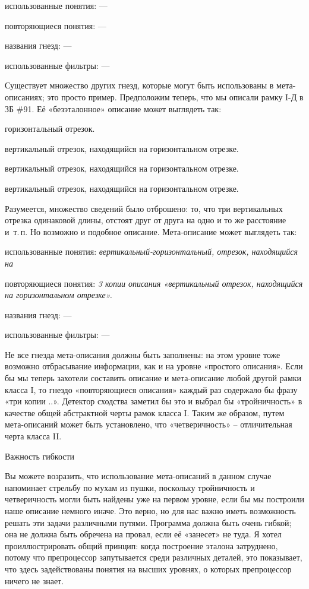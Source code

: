 \documentclass[../main.tex]{subfiles}
\begin{document}
использованные понятия: ---

повторяющиеся понятия: ---

названия гнезд: ---

использованные фильтры: ---

Существует множество других гнезд, которые могут быть использованы в мета-описаниях; это просто пример. Предположим теперь, что мы описали рамку I-Д в ЗБ \#91. Её «безэталонное» описание может выглядеть так:

горизонтальный отрезок.

вертикальный отрезок, находящийся на горизонтальном отрезке.

вертикальный отрезок, находящийся на горизонтальном отрезке.

вертикальный отрезок, находящийся на горизонтальном отрезке.

Разумеется, множество сведений было отброшено: то, что три вертикальных отрезка одинаковой длины, отстоят друг от друга на одно и то же расстояние и~т.\,п. Но возможно и подобное описание. Мета-описание может выглядеть так:

использованные понятия: \emph{вертикальный-горизонтальный, отрезок, находящийся на}

повторяющиеся понятия: \emph{3 копии описания «вертикальный отрезок, находящийся на горизонтальном отрезке».}

названия гнезд: ---

использованные фильтры: ---

Не все гнезда мета-описания должны быть заполнены: на этом уровне тоже возможно отбрасывание информации, как и на уровне «простого описания». Если бы мы теперь захотели составить описание и мета-описание любой другой рамки класса I, то гнездо «повторяющиеся описания» каждый раз содержало бы фразу «три копии ..». Детектор сходства заметил бы это и выбрал бы «тройничность» в качестве общей абстрактной черты рамок класса I. Таким же образом, путем мета-описаний может быть установлено, что «четверичность» \--- отличительная черта класса II.

Важность гибкости

Вы можете возразить, что использование мета-описаний в данном случае напоминает стрельбу по мухам из пушки, поскольку тройничность и четверичность могли быть найдены уже на первом уровне, если бы мы построили наше описание немного иначе. Это верно, но для нас важно иметь возможность решать эти задачи различными путями. Программа должна быть очень гибкой; она не должна быть обречена на провал, если её «занесет» не туда. Я хотел проиллюстрировать общий принцип: когда построение эталона затруднено, потому что препроцессор запутывается среди различных деталей, это показывает, что здесь задействованы понятия на высших уровнях, о которых препроцессор ничего не знает.
\end{document}
